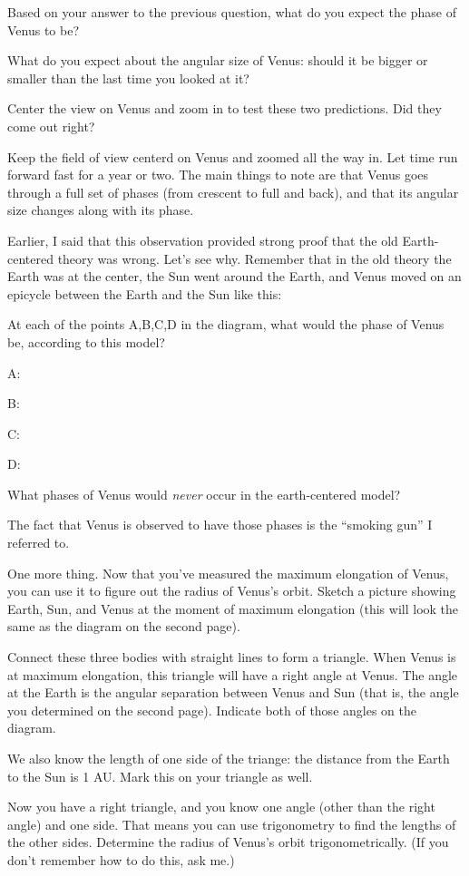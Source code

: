 \documentclass[twoside]{report}
\begin{document}
\vskip 0.7in

Based on your answer to the previous question, what do you expect the 
phase of Venus to be?

\vskip 0.7in

What do you expect about the angular size of Venus: should it be bigger
or smaller than the last time you looked at it?

\vskip 0.7in

Center the view on Venus and zoom in to test these two predictions.
Did they come out right?

\vskip 0.7in

Keep the field of view centerd on Venus and zoomed all the way in.  Let time
run forward fast for a year or two.  The main things to note are that
Venus goes through a full set of phases (from crescent to full and back),
and that its angular size changes along with its phase.

Earlier, I said that this observation provided strong proof that
the old Earth-centered theory was wrong.  Let's see why.  Remember that
in the old theory the Earth was at the center, the Sun went around the
Earth, and Venus moved on an epicycle between the Earth and the Sun like this:

\begin{figure}[h]
\centerline{\epsfxsize 3in}
\end{figure}

At each of the points A,B,C,D in the diagram, what would the phase
of Venus be, according to this model?

A:

B:

C: 

D:

What phases of Venus would {\it never} occur in the earth-centered
model?

\vskip 0.7in

The fact that Venus is observed to have those phases is the ``smoking
gun'' I referred to.

One more thing.  Now that you've measured the maximum elongation of
Venus, you can use it to figure out the radius of Venus's orbit.
Sketch a picture showing Earth, Sun, and Venus at the moment of 
maximum elongation (this will look the same as the diagram on the
second page).  

\vskip 2in

Connect these three bodies with straight lines to form a triangle.
When Venus is at maximum elongation, this triangle will have a right
angle at Venus.  The angle at the Earth is the angular separation
between Venus and Sun (that is, the angle you determined on the second page).
Indicate both of those angles on the diagram.

We also know the length of one side of the triange: the distance from
the Earth to the Sun is 1 AU.  Mark this on your triangle as well.

Now you have a right triangle, and you know one angle (other
than the right angle) and one side.
That means you can use trigonometry to find the lengths of the
other sides.  Determine the radius of Venus's orbit trigonometrically.
(If you don't remember how to do this, ask me.)
\end{document}
